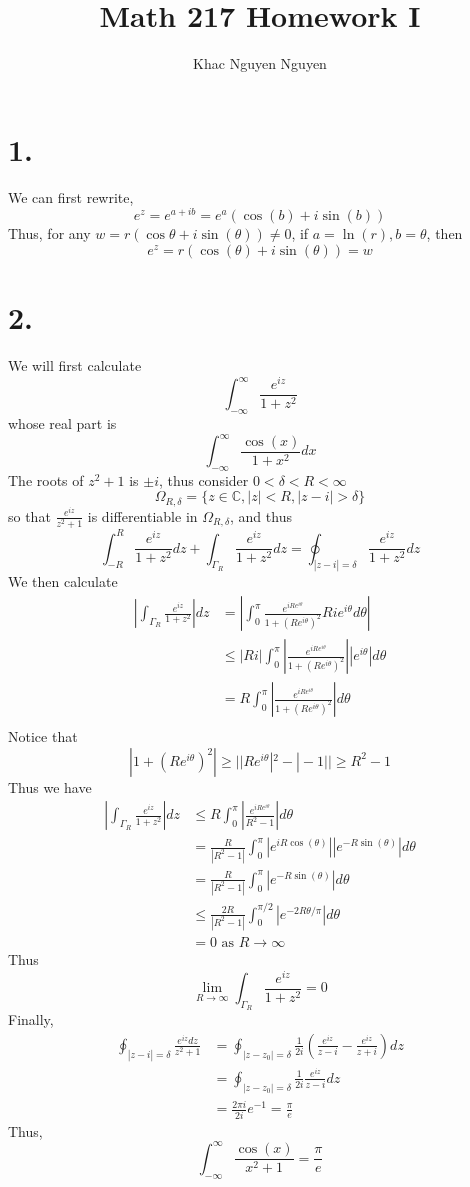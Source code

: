 \documentclass[11pt]{article}
\title{\textbf{Math 217 Homework I}}
\author{Khac Nguyen Nguyen}
\date{}
\theoremstyle{mystyle}
\theoremstyle{definition}
\begin{document}
\section*{1.}
We can first rewrite, 
\[
  e^z = e^{a + ib} = e^a (\cos(b) + i\sin(b))
\]
Thus, for any $w = r(\cos \theta + i\sin(\theta)) \ne 0$, if $a = \ln(r), b = \theta$, then 
\[
  e^z = r(\cos(\theta) + i\sin(\theta)) = w
\]
\clearpage 
\section*{2.}
We will first calculate 
\[
  \int_{-\infty}^\infty \displaystyle\frac{e^{iz}}{1+z^2} 
\]
whose real part is 
\[
  \int_{-\infty}^\infty \displaystyle\frac{\cos(x)}{1+x^2} dx
\]
The roots of $z^2 + 1$ is $\pm i$, thus consider $0 < \delta < R < \infty$
\[
  \Omega_{R, \delta} = \{z \in \mathbb{C}, |z| < R,|z -i| > \delta \}
\]
so that $\displaystyle\frac{e^{iz}}{z^2+1}$ is differentiable in $\Omega_{R, \delta}$, and thus 
\[
  \int_{-R}^R \displaystyle\frac{e^{iz}}{1+z^2} dz + \int_{\Gamma_R} \displaystyle\frac{e^{iz}}{1+z^2} dz = \oint_{|z-i| = \delta}   \displaystyle\frac{e^{iz}}{1+z^2} dz   
\]
We then calculate 
\begin{align*}
  \left|\int_{\Gamma_R} \displaystyle\frac{e^{iz}}{1+z^2} \right| dz 
  &= \left|\int_0^\pi \displaystyle\frac{e^{iRe^{i\theta}}}{1+ (Re^{i\theta})^2} Rie^{i\theta}d\theta \right| \\ 
  &\le |Ri| \int_0^\pi \left| \displaystyle\frac{e^{iRe^{i\theta}}}{1+ (Re^{i\theta})^2} \right| |e^{i\theta}| d\theta \\ 
  &= R \int_0^\pi \left| \displaystyle\frac{e^{iRe^{i\theta}}}{1+ (Re^{i\theta})^2} \right| d\theta \\ 
\end{align*}
Notice that 
\[
  |1+(Re^{i\theta})^2 | \ge ||Re^{i\theta}|^2 - |-1|| \ge R^2 - 1
\]
Thus we have 
\begin{align*}
  \left|\int_{\Gamma_R} \displaystyle\frac{e^{iz}}{1+z^2} \right| dz 
  &\le R \int_0^\pi \left| \displaystyle\frac{e^{iRe^{i\theta}}}{R^2-1} \right| d\theta \\
  &= \displaystyle\frac{R}{|R^2-1|} \int_0^\pi |e^{iR\cos(\theta)}||e^{-R\sin(\theta)}| d\theta \\
  &= \displaystyle\frac{R}{|R^2-1|} \int_0^\pi |e^{-R\sin(\theta)}| d\theta \\
  &\le \displaystyle\frac{2R}{|R^2-1|} \int_0^{\pi/2} |e^{-2R\theta/\pi}| d\theta \\
  &= 0 \text{ as } R \to \infty 
\end{align*}
Thus  
\[
  \lim_{R \to \infty} \int_{\Gamma_R} \displaystyle\frac{e^{iz}}{1+z^2} = 0
\]
Finally, 
\begin{align*}
  \oint_{|z-i| = \delta} \displaystyle\frac{e^{iz} dz}{z^2 + 1} 
  &= \oint_{|z-z_0| = \delta} \frac{1}{2i} \left(\displaystyle\frac{e^{iz}}{z-i} - \frac{e^{iz}}{z+i} \right) dz\\
  &= \oint_{|z-z_0| = \delta} \frac{1}{2i} \displaystyle\frac{e^{iz}}{z-i}   dz\\
  &= \displaystyle\frac{2\pi i}{2i} e^{-1} = \displaystyle\frac{\pi}{e} 
\end{align*}
Thus, 
\[
  \int_{-\infty}^\infty \displaystyle\frac{\cos(x)}{x^2+1} = \displaystyle\frac{\pi}{e}
\]
\clearpage
\end{document}
